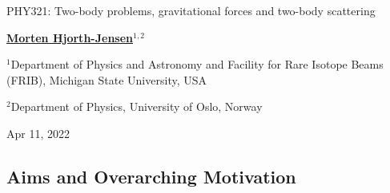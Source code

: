 \documentclass[%
oneside,                 %
final,                   %
10pt]{article}
\begin{document}

\newcommand{\exercisesection}[1]{\subsection*{#1}}






\thispagestyle{empty}

\begin{center}
{\LARGE\bf
\begin{spacing}{1.25}
PHY321: Two-body problems, gravitational forces and two-body scattering 
\end{spacing}
}
\end{center}


\begin{center}
{\bf \href{{http://mhjgit.github.io/info}}{Morten Hjorth-Jensen}${}^{1, 2}$} \\ [0mm]
\end{center}

\begin{center}
\centerline{{\small ${}^1$Department of Physics and Astronomy and Facility for Rare Isotope Beams (FRIB), Michigan State University, USA}}
\centerline{{\small ${}^2$Department of Physics, University of Oslo, Norway}}
\end{center}
    

\begin{center}
Apr 11, 2022
\end{center}

\vspace{1cm}


\subsection{Aims and Overarching Motivation}
\end{document}
